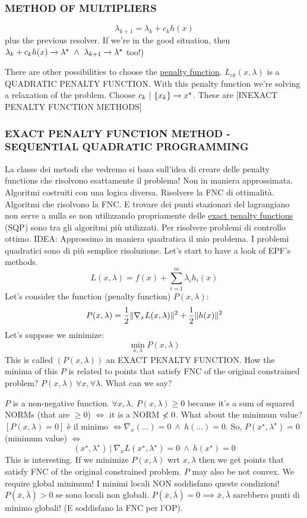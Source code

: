 \subsubsection{METHOD OF MULTIPLIERS}
\[
	\lambda_{k+1} = \lambda_k +c_kh(x)
\]
plus the previous resolver. If we're in the good situation, then $\lambda_k + c_kh(x) \tendsto{} \lambda^\star\ \land\ \lambda_{k+1}\tendsto{}\lambda^\star$ too!)

There are other possibilities to choose the \underline{penalty function}. $L_{ck}(x,\lambda)$ is a QUADRATIC PENALTY FUNCTION. With this penalty function we're solving a relaxation of the problem. Choose $c_k\ |\ \{x_k\} \tendsto{} x^\star$. These are [INEXACT PENALTY FUNCTION METHODS]

\subsubsection{EXACT PENALTY FUNCTION METHOD - SEQUENTIAL QUADRATIC PROGRAMMING}

La classe dei metodi che vedremo si basa sull'idea di creare delle penalty functions che risolvono esattamente il problema! Non in maniera approssimata. Algoritmi costruiti con una logica diversa. Risolvere la FNC di ottimalità. Algoritmi che risolvono la FNC. E trovare dei punti stazionari del lagrangiano non serve a nulla se non utilizzando propriamente delle \underline{exact penalty functions}
(SQP) sono tra gli algoritmi più utilizzati. Per risolvere problemi di controllo ottimo. IDEA: Approssimo in maniera quadratica il mio problema. I problemi quadratici sono di più semplice risoluzione. Let's start to have a look of EPF's methods.
\[
	L(x,\lambda) = f(x) + \sum_{i=1}^m{\lambda_ih_i(x)}
\]
Let's consider the function (penalty function) $P(x,\lambda)$:
\[
	P(x,\lambda) = \frac{1}{2}\lVert\nabla_x{L(x,\lambda)}\rVert^2 + \frac{1}{2}\lVert h(x)\rVert^2
\]
Let's suppose we minimize:
\[
	\min_{x,\lambda}{P(x,\lambda)}
\]
This is called $(P(x,\lambda))$ an EXACT PENALTY FUNCTION. How the minima of this $P$ is related to points that satisfy FNC of the original constrained problem? $P(x,\lambda)\ \forall x,\forall\lambda$. What can we say?

$P$ is a non-negative function. $\forall x,\lambda,\ P(x,\lambda)\geq 0$ because it's a sum of squared NORMs (that are $\geq 0$) $\iff$ it is a NORM $\centernot{<}0$. What about the minimum value? $[P(x,\lambda)=0]$ è il minimo $\iff \nabla_x(\dots) = 0\ \land\ h(\dots) = 0$. So, $P(x^\star,\lambda^\star)=0$ (minimum value) $\iff$
\[
	(x^\star,\lambda^\star)\ |\ \nabla_x{L(x^\star,\lambda^\star)} = 0\ \land\ h(x^\star)=0 
\]
This is interesting. If we minimize $P(x,\lambda)$ wrt $x,\lambda$ then we get points that satisfy FNC of the original constrained problem. $P$ may also be not convex. We require global minimum! I minimi locali NON soddisfano queste condizioni! $P(\bar{x},\bar{\lambda}) > 0$ se sono locali non globali. $P(\bar{x},\bar{\lambda}) = 0 \implies \bar{x},\bar{\lambda}$ sarebbero punti di minimo globali! (E soddisfano la FNC per l'OP).


